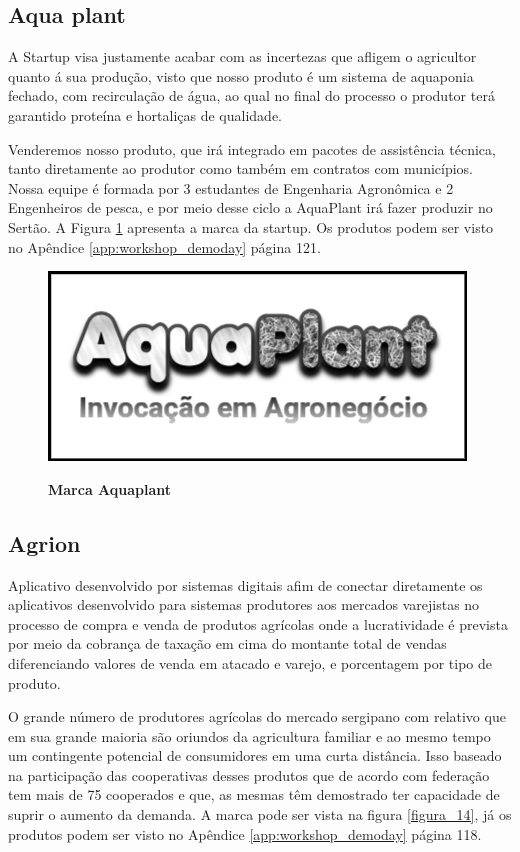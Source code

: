\subsection{Aqua plant}



A Startup visa justamente acabar com as incertezas que  afligem o agricultor quanto á sua produção, visto que nosso produto é um sistema de aquaponia fechado, com recirculação de água, ao qual no final do processo o produtor terá garantido proteína e hortaliças de qualidade. 

Venderemos nosso produto, que irá integrado em pacotes de assistência técnica, tanto diretamente ao produtor como também em contratos com municípios. Nossa equipe é formada por 3 estudantes de Engenharia Agronômica e 2 Engenheiros de pesca, e por meio desse ciclo a AquaPlant irá fazer produzir no Sertão. A Figura \ref{figura_13} apresenta a marca da startup. Os produtos podem ser visto no Apêndice \ref{app:workshop_demoday} página 121. 


\begin{figure}[H]
\centering
\caption{\textbf{Marca Aquaplant}}
\includegraphics[scale=0.5]{Imagens/aquaplant.png}
\label{figura_13}
\end{figure}


\subsection{Agrion}

Aplicativo desenvolvido por sistemas digitais afim de conectar diretamente os aplicativos desenvolvido para sistemas produtores aos mercados varejistas no processo de compra e venda de produtos agrícolas onde a lucratividade é prevista por meio da cobrança de taxação em cima do montante total de vendas diferenciando valores de venda em atacado e varejo, e porcentagem por tipo de produto.

O grande número de produtores agrícolas  do mercado sergipano com relativo que  em sua grande maioria são oriundos da agricultura familiar e ao mesmo tempo um contingente potencial de consumidores em uma curta distância. Isso baseado na  participação das cooperativas desses produtos que de acordo 
com federação tem mais de 75 cooperados e que, as mesmas têm demostrado ter capacidade de suprir o aumento da demanda. A marca pode ser vista na figura \ref{figura_14}, já os produtos podem ser visto no Apêndice \ref{app:workshop_demoday} página 118.


